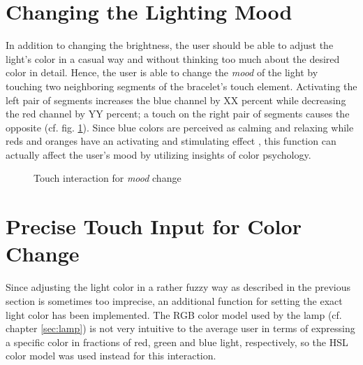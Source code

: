 \section{Changing the Lighting Mood}
In addition to changing the brightness, the user should be able to adjust the light's color in a casual way and without thinking too much about the desired color in detail. Hence, the user is able to change the \textit{mood} of the light by touching two neighboring segments of the bracelet's touch element. Activating the left pair of segments increases the blue channel by XX percent while decreasing the red channel by YY percent; a touch on the right pair of segments causes the opposite (cf. fig. \ref{fig:mood}). Since blue colors are perceived as calming and relaxing while reds and oranges have an activating and stimulating effect \cite{Rosenstein1985}, this function can actually affect the user's mood by utilizing insights of color psychology.

\begin{figure}[bth]
	\myfloatalign
	 \quad
	\caption{Touch interaction for \textit{mood} change}
	\label{fig:mood}
\end{figure}

\section{Precise Touch Input for Color Change}
Since adjusting the light color in a rather fuzzy way as described in the previous section is sometimes too imprecise, an additional function for setting the exact light color has been implemented. The RGB color model used by the lamp (cf. chapter \ref{sec:lamp}) is not very intuitive to the average user in terms of expressing a specific color in fractions of red, green and blue light, respectively, so the \ac{HSL} color model was used instead for this interaction.

